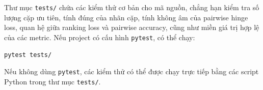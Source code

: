 Thư mục \texttt{tests/} chứa các kiểm thử cơ bản cho mã nguồn, chẳng hạn kiểm tra số lượng cặp ưu tiên, tính đúng của nhãn cặp, tính không âm của pairwise hinge loss, quan hệ giữa ranking loss và pairwise accuracy, cũng như miền giá trị hợp lệ của các metric. Nếu project có cấu hình \texttt{pytest}, có thể chạy:

\begin{lstlisting}[language=bash]
pytest tests/
\end{lstlisting}

Nếu không dùng \texttt{pytest}, các kiểm thử có thể được chạy trực tiếp bằng các script Python trong thư mục \texttt{tests/}.
